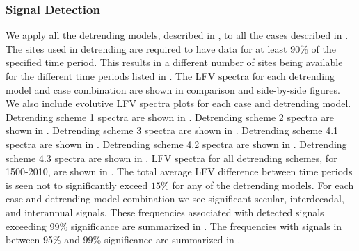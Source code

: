 \documentclass[phd,tocprelim]{cornell}
\begin{document}
\subsubsection{Signal Detection}
We apply all the detrending models, described in , 
to all the cases described in . The sites used in 
detrending are required to have data for at least $90\%$ of the specified
time period. This results in a different number of sites being available
for the different time periods listed in . 
The LFV spectra for each detrending model and case combination are 
shown in comparison and side-by-side figures. We also include evolutive 
LFV spectra plots for each case and detrending model. 
Detrending scheme 1 spectra are shown in 
. 
Detrending scheme 2 spectra are shown in 
. 
Detrending scheme 3 spectra are shown in 
. 
Detrending scheme 4.1 spectra are shown in 
. 
Detrending scheme 4.2 spectra are shown in 
. 
Detrending scheme 4.3 spectra are shown in 
. 
LFV spectra for all detrending schemes, for 1500-2010, are shown 
in . The total average LFV difference between time 
periods is seen not to significantly exceed $15\%$ for any of the 
detrending models. For each case and detrending model combination we see 
significant secular, interdecadal, and interannual signals. These 
frequencies associated with detected signals exceeding 99\% significance 
are summarized in . The frequencies with signals in between 
95\% and 99\% significance are summarized in . 
\end{document}
